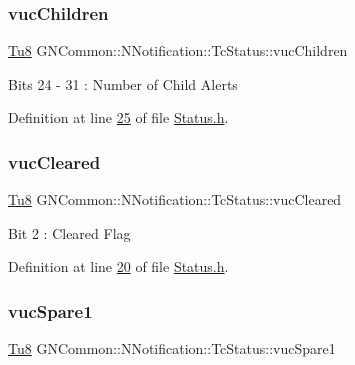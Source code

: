 \subsubsection{\texorpdfstring{vuc\+Children}{vucChildren}}
{\footnotesize\ttfamily \mbox{\hyperlink{namespace_g_n_common_a7939e251ddbf5d3a31832dcfdc8bde39}{Tu8}} G\+N\+Common\+::\+N\+Notification\+::\+Tc\+Status\+::vuc\+Children}

Bits 24 -\/ 31 \+: Number of Child Alerts 

Definition at line \mbox{\hyperlink{_status_8h_source_l00025}{25}} of file \mbox{\hyperlink{_status_8h_source}{Status.\+h}}.

\mbox{\label{class_g_n_common_1_1_n_notification_1_1_tc_status_a36e84f5ebb3fda08f3ddaccde0a1c37b}} 
\subsubsection{\texorpdfstring{vuc\+Cleared}{vucCleared}}
{\footnotesize\ttfamily \mbox{\hyperlink{namespace_g_n_common_a7939e251ddbf5d3a31832dcfdc8bde39}{Tu8}} G\+N\+Common\+::\+N\+Notification\+::\+Tc\+Status\+::vuc\+Cleared}

Bit 2 \+: Cleared Flag 

Definition at line \mbox{\hyperlink{_status_8h_source_l00020}{20}} of file \mbox{\hyperlink{_status_8h_source}{Status.\+h}}.

\mbox{\label{class_g_n_common_1_1_n_notification_1_1_tc_status_ad8eff97b5c02e0409d3cbc65bf65c313}} 
\subsubsection{\texorpdfstring{vuc\+Spare1}{vucSpare1}}
{\footnotesize\ttfamily \mbox{\hyperlink{namespace_g_n_common_a7939e251ddbf5d3a31832dcfdc8bde39}{Tu8}} G\+N\+Common\+::\+N\+Notification\+::\+Tc\+Status\+::vuc\+Spare1}

